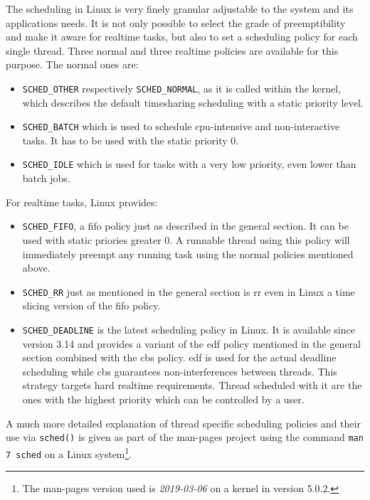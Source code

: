 The scheduling in Linux is very finely granular adjustable to the system and its applications needs.
It is not only possible to select the grade of preemptibility and make it aware for realtime tasks, but also to set a scheduling policy for each single thread.
Three normal and three realtime policies are available for this purpose.
The normal ones are:
\begin{itemize}
    \item \texttt{SCHED\_OTHER} respectively \texttt{SCHED\_NORMAL}, as it is called within the kernel, which describes the default timesharing scheduling with a static priority level.
    \item \texttt{SCHED\_BATCH} which is used to schedule \ac{cpu}-intensive and non-interactive tasks. It has to be used with the static priority 0.
    \item \texttt{SCHED\_IDLE} which is used for tasks with a very low priority, even lower than batch jobs.
\end{itemize}
For realtime tasks, Linux provides:
\begin{itemize}
    \item \texttt{SCHED\_FIFO}, a \acl{fifo} policy just as described in the general section. It can be used with static priories greater 0. A runnable thread using this policy will immediately preempt any running task using the normal policies mentioned above.
    \item \texttt{SCHED\_RR} just as mentioned in the general section is \acl{rr} even in Linux a time slicing version of the \ac{fifo} policy.
    \item \texttt{SCHED\_DEADLINE} is the latest scheduling policy in Linux. It is available since version 3.14 and provides a variant of the \acl{edf} policy mentioned in the general section combined with the \ac{cbs} policy.
    \ac{edf} is used for the actual deadline scheduling while \ac{cbs} guarantees non-interferences between threads.
    This strategy targets hard realtime requirements. Thread scheduled with it are the ones with the highest priority which can be controlled by a user.
\end{itemize}
A much more detailed explanation of thread specific scheduling policies and their use via \texttt{sched()} is given as part of the man-pages project using the command \texttt{man 7 sched} on a Linux system\footnote{The man-pages version used is \textit{2019-03-06} on a kernel in version 5.0.2.}.  


